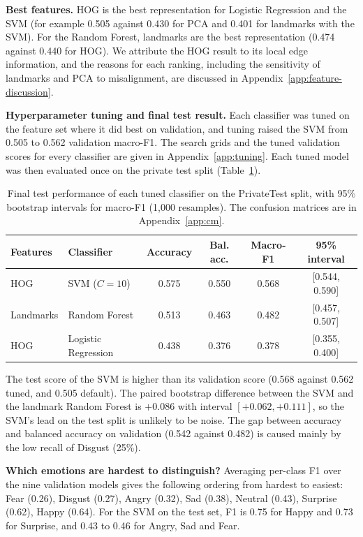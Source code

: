 \textbf{Best features.} HOG is the best representation for Logistic Regression and the SVM (for example 0.505 against 0.430 for PCA and 0.401 for landmarks with the SVM). For the Random Forest, landmarks are the best representation (0.474 against 0.440 for HOG). We attribute the HOG result to its local edge information, and the reasons for each ranking, including the sensitivity of landmarks and PCA to misalignment, are discussed in Appendix~\ref{app:feature-discussion}.

\textbf{Hyperparameter tuning and final test result.} Each classifier was tuned on the feature set where it did best on validation, and tuning raised the SVM from 0.505 to 0.562 validation macro-F1. The search grids and the tuned validation scores for every classifier are given in Appendix~\ref{app:tuning}. Each tuned model was then evaluated once on the private test split (Table~\ref{tab:fer-test}).

\begin{table}[h]
\centering\small
\caption{Final test performance of each tuned classifier on the PrivateTest split, with 95\% bootstrap intervals for macro-F1 (1,000 resamples). The confusion matrices are in Appendix~\ref{app:cm}.}
\label{tab:fer-test}
\begin{tabular}{@{}llcccc@{}}\toprule
Features & Classifier & Accuracy & Bal. acc. & Macro-F1 & 95\% interval \\\midrule
HOG & SVM ($C = 10$) & 0.575 & 0.550 & 0.568 & [0.544, 0.590] \\
Landmarks & Random Forest & 0.513 & 0.463 & 0.482 & [0.457, 0.507] \\
HOG & Logistic Regression & 0.438 & 0.376 & 0.378 & [0.355, 0.400] \\
\bottomrule\end{tabular}
\end{table}

The test score of the SVM is higher than its validation score (0.568 against 0.562 tuned, and 0.505 default). The paired bootstrap difference between the SVM and the landmark Random Forest is $+0.086$ with interval $[+0.062, +0.111]$, so the SVM's lead on the test split is unlikely to be noise. The gap between accuracy and balanced accuracy on validation (0.542 against 0.482) is caused mainly by the low recall of Disgust (25\%).

\textbf{Which emotions are hardest to distinguish?} Averaging per-class F1 over the nine validation models gives the following ordering from hardest to easiest: Fear (0.26), Disgust (0.27), Angry (0.32), Sad (0.38), Neutral (0.43), Surprise (0.62), Happy (0.64). For the SVM on the test set, F1 is 0.75 for Happy and 0.73 for Surprise, and 0.43 to 0.46 for Angry, Sad and Fear.

